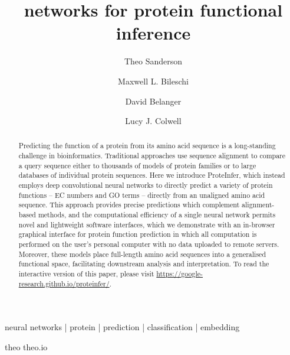 \title{\DIFdelbegin {}\DIFdelend \DIFaddbegin {}\DIFaddend networks for protein functional inference}
\author[*,1,\Letter]{Theo Sanderson}
\author[*,2]{Maxwell L. Bileschi}
\author[2]{David Belanger}
\author[2]{Lucy J. Colwell}




\maketitle



\begin{abstract}
  Predicting the function of a protein from its amino acid sequence is a long-standing challenge in bioinformatics. Traditional approaches use sequence alignment to compare a query sequence either to thousands of models of protein families or to large databases of individual protein sequences. Here we introduce ProteInfer, which instead employs deep convolutional neural networks to directly predict a variety of protein functions -- EC numbers and GO terms -- directly from an unaligned amino acid sequence. This approach provides precise predictions which complement alignment-based methods, and the computational efficiency of a single neural network permits novel and lightweight software interfaces, which we demonstrate with an in-browser graphical interface for protein function prediction in which all computation is performed on the user's personal computer with no data uploaded to remote servers. Moreover, these models place full-length amino acid sequences into a generalised functional space, facilitating downstream analysis and interpretation. To read the interactive version of this paper, please visit \url{https://google-research.github.io/proteinfer/}.
\end {abstract}

\begin{keywords}
neural networks | protein | prediction | classification | embedding
\end{keywords}


\begin{corrauthor}
theo \at \;theo.io
\end{corrauthor}

